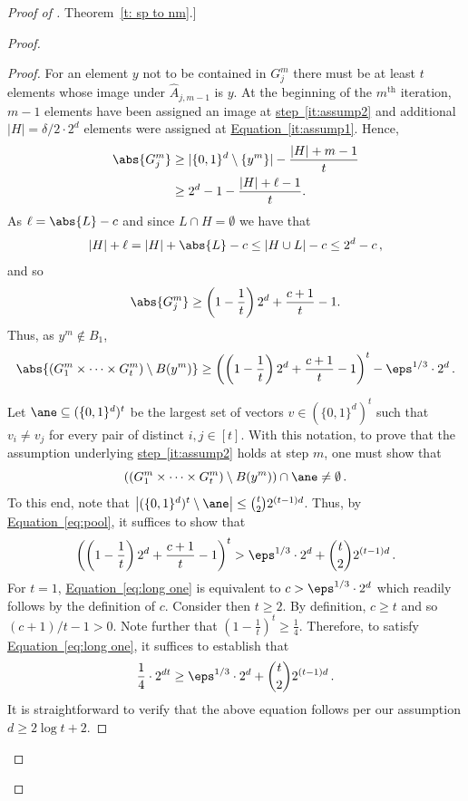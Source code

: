 \documentclass[11pt]{article}
\numberwithin{equation}{section}
\theoremstyle{definition}
\theoremstyle{plain}
\newcommand{\expref}[2]{\hyperref[#2]{#1~\ref{#2}}}
\newcommand{\expeqref}[2]{\hyperref[#2]{#1~\eqref{#2}}}
\begin{document}
\begin{proof}[Proof of \expref{Theorem}{t: sp to nm}.]
\begin{proof}
\begin{proof}
For an element $y$ not to be contained in $G^m_j$ there must be at least $t$ elements whose image under $\widehat{A}_{j,m-1}$ is $y$. At the beginning of the $m^{\text{th}}$ iteration, $m-1$ elements have been assigned an image at \expeqref{step}{it:assump2} and additional 
%
%
$|H| = \delta/2 \cdot 2^d$ 
%
elements were assigned at  \expeqref{Equation}{it:assump1}. Hence,
\begin{align}\label{eq:gm bound}
\abs{G_j^m} &\geq |\{0,1\}^d \setminus \{ y^m\}| - \frac{|H| + m-1}{t} \notag \\
&\ge 2^d -1 - \frac{|H| + \ell-1}{t}. %
%
\end{align}
As
$\ell = \abs{L} - c$ and since $L \cap H = \emptyset$ we have that
\[
|H|+\ell = |H| + \abs{L} - c \le |H \cup L| - c \le 2^d-c\,,
\]
and so
\[
\abs{G_j^m} \ge \left(1-\frac1{t}\right)2^d +  \frac{c+1}{t} -1.%
\]
Thus, as $y^m \not\in B_1$,
\begin{equation}\label{eq:pool}
\abs{\left(G_1^m \times \cdots \times G_t^m\right) \setminus B(y^m)} \ge \left(\left(1-\frac1{t} \right)2^d +  \frac{c+1}{t} -1\right)^t - \eps^{1/3} \cdot 2^d\,.
\end{equation}
%
%



Let $\ane \subseteq (\{0,1\}^d)^t$ be the largest set of vectors $v \in (\{0,1\}^d)^t$ such that $v_i \neq v_j$ for every pair of distinct $i,j \in [t]$. With this notation, to prove that the assumption underlying  \expeqref{step}{it:assump2} holds at step $m$, one must show that
\begin{equation}\label{eq:eqeqeqqeqeqseger}
\left(\left(G_1^m \times \cdots \times G_t^m \right)\setminus B(y^m)\right)\cap \ane \neq \emptyset\,.
\end{equation}
To this end, note that $\left|(\{0,1\}^d)^t \setminus \ane\right| \le \binom{t}{2} 2^{(t-1)d}$. Thus, by \expeqref{Equation}{eq:pool}, it suffices to show that
\begin{equation}\label{eq:long one}
\left(\left(1-\frac1{t} \right)2^d +  \frac{c+1}{t} -1\right)^t > \eps^{1/3} \cdot 2^d + \binom{t}{2} 2^{(t-1)d}\,. 
\end{equation}
For $t=1$, \expeqref{Equation}{eq:long one} is equivalent to
$
c > \eps^{1/3} \cdot 2^d
$
which readily follows by the definition of $c$. Consider then $t \ge 2$. By definition, $c \ge t$ and so %
%
$(c+1)/t-1 > 0$. 
%
Note further that $\left(1-\frac1{t}\right)^t \ge \frac1{4}$. Therefore, to satisfy \expeqref{Equation}{eq:long one}, it suffices to establish that
\[
\frac1{4} \cdot 2^{dt} \ge \eps^{1/3} \cdot 2^d + \binom{t}{2} 2^{(t-1)d}\,.
\]
It is straightforward to verify that the above equation follows per our assumption $d \ge 2\log{t} + 2$.
\end{proof}



\end{proof}
\end{proof}
\end{document}
